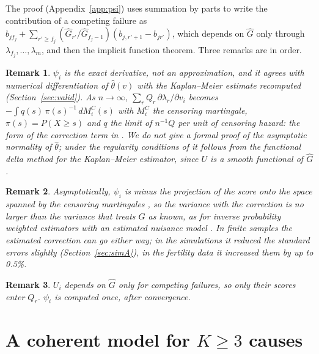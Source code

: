 \documentclass[11pt]{article}
\newtheorem{remark}{Remark}
\newcommand{\Ghat}{\widehat G}
\begin{document}
The proof (Appendix~\ref{app:psi}) uses summation by parts to write the contribution of a
competing failure as $b_{j f_j} + \sum_{r' \ge f_j} (\Ghat_{r'}/\Ghat_{f_j-1})(b_{j,r'+1} - b_{jr'})$,
which depends on $\Ghat$ only through $\lambda_{f_j}, \dots, \lambda_{m}$, and then the implicit
function theorem. Three remarks are in order.

\begin{remark}
$\psi_i$ is the exact derivative, not an approximation, and it agrees with numerical
differentiation of $\hat\theta(v)$ with the Kaplan--Meier estimate recomputed (Section~\ref{sec:valid}).
As $n \to \infty$, $\sum_r Q_r\,\partial\lambda_r/\partial v_i$ becomes $-\int q(s)\,
\pi(s)^{-1}\,dM_i^C(s)$ with $M_i^C$ the censoring martingale, $\pi(s) = P(X \ge s)$ and $q$
the limit of $n^{-1} Q$ per unit of censoring hazard: the form of the correction term in
\citet[Section~3.2]{fine1999}. We do not give a formal proof of the asymptotic normality of
$\hat\theta$; under the regularity conditions of \citet{fine1999} it follows from the functional
delta method for the Kaplan--Meier estimator, since $U$ is a smooth functional of $\Ghat$.
\end{remark}

\begin{remark}
Asymptotically, $\psi_i$ is minus the projection of the score onto the space spanned by the
censoring martingales \citep{tsiatis2006}, so the variance with the correction is no larger than the
variance that treats $G$ as known, as for inverse probability weighted estimators with an estimated
nuisance model \citep{robins1994}. In finite samples the estimated correction can go either way; in
the simulations it reduced the standard errors slightly (Section~\ref{sec:simA}), in the fertility
data it increased them by up to 0.5\%.
\end{remark}

\begin{remark}
$U_i$ depends on $\Ghat$ only for competing failures, so only their scores enter $Q_r$.
$\psi_i$ is computed once, after convergence.
\end{remark}

\section{A coherent model for $K \ge 3$ causes}\label{sec:constrained}
\end{document}
